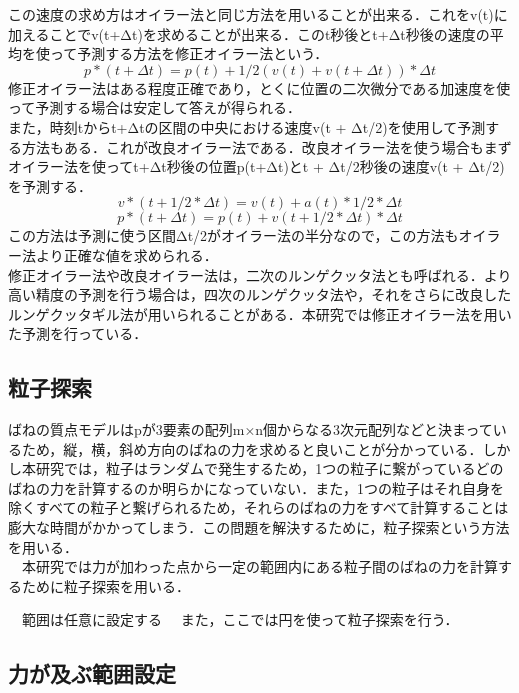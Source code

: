 \documentclass[11pt]{jreport}
\begin{document}
この速度の求め方はオイラー法と同じ方法を用いることが出来る．これをv(t)に加えることでv(t+Δt)を求めることが出来る．このt秒後とt+Δt秒後の速度の平均を使って予測する方法を修正オイラー法という．
\begin{equation} 
  p*(t + Δt) = p(t) + 1/2(v(t)+v(t+Δt)) * Δt \label{exp:sample}
\end{equation}
修正オイラー法はある程度正確であり，とくに位置の二次微分である加速度を使って予測する場合は安定して答えが得られる．\\
また，時刻tからt+Δtの区間の中央における速度v(t + Δt/2)を使用して予測する方法もある．これが改良オイラー法である．改良オイラー法を使う場合もまずオイラー法を使ってt+Δt秒後の位置p(t+Δt)とt + Δt/2秒後の速度v(t + Δt/2)を予測する．
\begin{equation}
  v*(t + 1/2*Δt) = v(t) + a(t) * 1/2*Δt \label{exp:sample}
\end{equation}
\begin{equation}
  p*(t + Δt) = p(t) + v(t+1/2 * Δt) * Δt \label{exp:sample}
\end{equation}
この方法は予測に使う区間Δt/2がオイラー法の半分なので，この方法もオイラー法より正確な値を求められる．\\
修正オイラー法や改良オイラー法は，二次のルンゲクッタ法とも呼ばれる．より高い精度の予測を行う場合は，四次のルンゲクッタ法や，それをさらに改良したルンゲクッタギル法が用いられることがある．本研究では修正オイラー法を用いた予測を行っている．

\subsection{粒子探索}
 ばねの質点モデルはpが3要素の配列m×n個からなる3次元配列などと決まっているため，縦，横，斜め方向のばねの力を求めると良いことが分かっている．しかし本研究では，粒子はランダムで発生するため，1つの粒子に繋がっているどのばねの力を計算するのか明らかになっていない．また，1つの粒子はそれ自身を除くすべての粒子と繋げられるため，それらのばねの力をすべて計算することは膨大な時間がかかってしまう．この問題を解決するために，粒子探索という方法を用いる．\\
　本研究では力が加わった点から一定の範囲内にある粒子間のばねの力を計算するために粒子探索を用いる．

　範囲は任意に設定する
　また，ここでは円を使って粒子探索を行う．

\subsection{力が及ぶ範囲設定}
\end{document}
